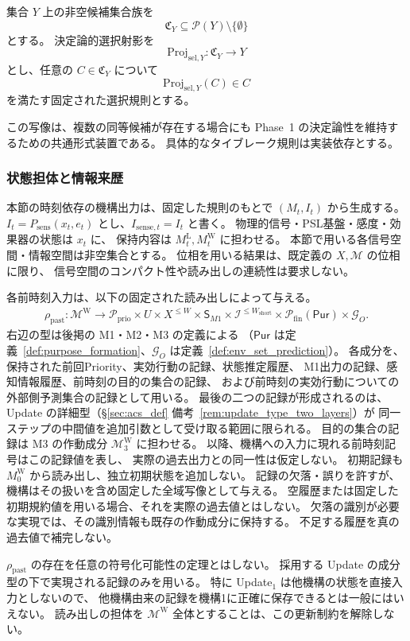\begin{definition}
\label{def:sel_proj}
集合 $Y$ 上の非空候補集合族を
\[
  \mathfrak C_Y
  \subseteq
  \mathcal P(Y)\setminus\{\emptyset\}
\]
とする。
決定論的選択射影を
\[
  \mathrm{Proj}_{\mathrm{sel},Y}:
  \mathfrak C_Y
  \to Y
\]
とし、任意の $C\in\mathfrak C_Y$ について
\[
  \mathrm{Proj}_{\mathrm{sel},Y}(C)\in C
\]
を満たす固定された選択規則とする。

この写像は、複数の同等候補が存在する場合にも
Phase~1 の決定論性を維持するための共通形式装置である。
具体的なタイブレーク規則は実装依存とする。
\end{definition}

\subsubsection{状態担体と情報来歴}
\begin{definition}
\label{def:s4_carrier_contract}
本節の時刻依存の機構出力は、固定した規則のもとで $(M_t,I_t)$ から生成する。
$I_t=P_{\mathrm{sens}}(x_t,e_t)$ とし、$I_{\mathrm{sense},t}=I_t$ と書く。
物理的信号・PSL基盤・感度・効果器の状態は $x_t$ に、
保持内容は $M_t^{\mathrm L},M_t^{\mathrm W}$ に担わせる。
本節で用いる各信号空間・情報空間は非空集合とする。
位相を用いる結果は、既定義の $X,\mathcal M$ の位相に限り、
信号空間のコンパクト性や読み出しの連続性は要求しない。

各前時刻入力は、以下の固定された読み出しによって与える。
\[
\begin{aligned}
\rho_{\mathrm{past}}:\mathcal M^{\mathrm W}\longrightarrow
 \mathcal P_{\mathrm{prio}}\times U\times X^{\le W}
 \times\mathsf S_{M1}\times\mathcal I^{\le W_{\mathrm{short}}}
 \times\mathcal P_{\mathrm{fin}}(\mathsf{Pur})\times\mathcal G_O.
\end{aligned}
\]
右辺の型は後掲の M1・M2・M3 の定義による
（$\mathsf{Pur}$ は定義~\ref{def:purpose_formation}、$\mathcal G_O$ は定義~\ref{def:env_set_prediction}）。
各成分を、保持された前回Priority、実効行動の記録、状態推定履歴、
M1出力の記録、感知情報履歴、前時刻の目的の集合の記録、
および前時刻の実効行動についての外部側予測集合の記録として用いる。
最後の二つの記録が形成されるのは、
Update の詳細型（\S\ref{sec:acs_def} 備考~\ref{rem:update_type_two_layers}）が
同一ステップの中間値を追加引数として受け取る範囲に限られる。
目的の集合の記録は M3 の作動成分 $\mathcal M_3^{\mathrm W}$ に担わせる。
以降、機構への入力に現れる前時刻記号はこの記録値を表し、
実際の過去出力との同一性は仮定しない。
初期記録も $M_0^{\mathrm W}$ から読み出し、独立初期状態を追加しない。
記録の欠落・誤りを許すが、機構はその扱いを含め固定した全域写像として与える。
空履歴または固定した初期規約値を用いる場合、それを実際の過去値とはしない。
欠落の識別が必要な実現では、その識別情報も既存の作動成分に保持する。
不足する履歴を真の過去値で補完しない。

$\rho_{\mathrm{past}}$ の存在を任意の符号化可能性の定理とはしない。
採用する Update の成分型の下で実現される記録のみを用いる。
特に Update$_1$ は他機構の状態を直接入力としないので、
他機構由来の記録を機構1に正確に保存できるとは一般にはいえない。
読み出しの担体を $\mathcal M^{\mathrm W}$ 全体とすることは、この更新制約を解除しない。
\end{definition}

